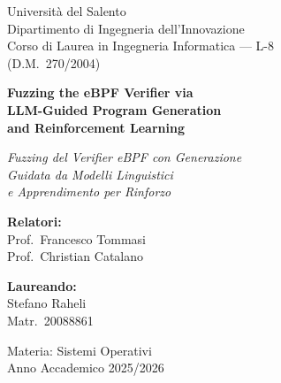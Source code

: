 %   

\begin{titlepage}
  \centering

  {\large
    Università del Salento\\[0.4em]
    Dipartimento di Ingegneria dell'Innovazione\\[0.4em]
    Corso di Laurea in Ingegneria Informatica --- L-8\\[0.3em]
    (D.M.\ 270/2004)
  \par}

  \vspace{2.5cm}

  {\LARGE\bfseries
    Fuzzing the eBPF Verifier via\\[0.4em]
    LLM-Guided Program Generation\\[0.4em]
    and Reinforcement Learning
  \par}

  \vspace{0.8cm}

  {\large\itshape
    Fuzzing del Verifier eBPF con Generazione\\[0.3em]
    Guidata da Modelli Linguistici\\[0.3em]
    e Apprendimento per Rinforzo
  \par}

  \vspace{3cm}

  \begin{minipage}[t]{0.48\textwidth}
    \begin{flushleft}
      \textbf{Relatori:}\\[0.4em]
      Prof.\ Francesco Tommasi\\[0.3em]
      Prof.\ Christian Catalano
    \end{flushleft}
  \end{minipage}
  \hfill
  \begin{minipage}[t]{0.48\textwidth}
    \begin{flushright}
      \textbf{Laureando:}\\[0.4em]
      Stefano Raheli\\[0.3em]
      Matr.\ 20088861
    \end{flushright}
  \end{minipage}

  \vfill

  {\large
    Materia: Sistemi Operativi\\[0.5em]
    Anno Accademico 2025/2026
  \par}

\end{titlepage}
